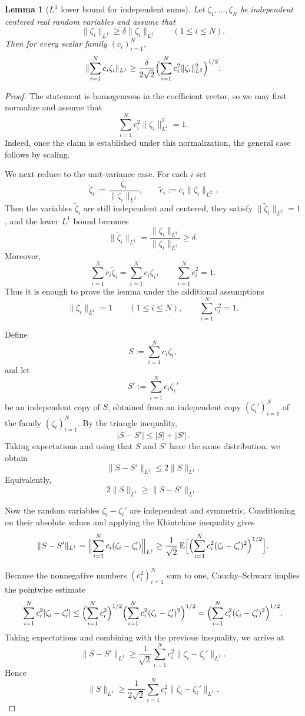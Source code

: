 \documentclass[11pt]{amsart}
\numberwithin{equation}{section}
\newtheorem{lemma}[theorem]{Lemma}
\theoremstyle{definition}
\theoremstyle{remark}
\newcommand{\E}{\mathbb E}
\newcommand{\abs}[1]{\lvert #1 \rvert}
\newcommand{\norm}[1]{\lVert #1 \rVert}
\begin{document}
\begin{lemma}[$L^1$ lower bound for independent sums]\label{lem:l1lower}
Let $\zeta_1,\dots,\zeta_N$ be independent centered real random variables and
assume that
\[
\norm{\zeta_i}_{L^1}\ge \delta \norm{\zeta_i}_{L^2}
\qquad(1\le i\le N).
\]
Then for every scalar family $(c_i)_{i=1}^N$,
\[
\norm{\sum_{i=1}^N c_i\zeta_i}_{L^1}
\ge
\frac{\delta}{2\sqrt2}
\Bigl(\sum_{i=1}^N c_i^2\norm{\zeta_i}_{L^2}^2\Bigr)^{1/2}.
\]
\end{lemma}

\begin{proof}
The statement is homogeneous in the coefficient vector, so we may first
normalize and assume that
\[
\sum_{i=1}^N c_i^2\norm{\zeta_i}_{L^2}^2=1.
\]
Indeed, once the claim is established under this normalization, the general
case follows by scaling.

We next reduce to the unit-variance case.  For each $i$ set
\[
\widetilde\zeta_i:=\frac{\zeta_i}{\norm{\zeta_i}_{L^2}},
\qquad
\widetilde c_i:=c_i\norm{\zeta_i}_{L^2}.
\]
Then the variables $\widetilde\zeta_i$ are still independent and centered,
they satisfy $\norm{\widetilde\zeta_i}_{L^2}=1$, and the lower $L^1$ bound
becomes
\[
\norm{\widetilde\zeta_i}_{L^1}
=\frac{\norm{\zeta_i}_{L^1}}{\norm{\zeta_i}_{L^2}}
\ge \delta.
\]
Moreover,
\[
\sum_{i=1}^N \widetilde c_i \widetilde\zeta_i
=\sum_{i=1}^N c_i\zeta_i,
\qquad
\sum_{i=1}^N \widetilde c_i^2
=1.
\]
Thus it is enough to prove the lemma under the additional assumptions
\[
\norm{\zeta_i}_{L^2}=1
\qquad(1\le i\le N),
\qquad
\sum_{i=1}^N c_i^2=1.
\]

Define
\[
S:=\sum_{i=1}^N c_i\zeta_i,
\]
and let
\[
S':=\sum_{i=1}^N c_i\zeta_i'
\]
be an independent copy of $S$, obtained from an independent copy
$(\zeta_i')_{i=1}^N$ of the family $(\zeta_i)_{i=1}^N$.
By the triangle inequality,
\[
\abs{S-S'}\le \abs{S}+\abs{S'}.
\]
Taking expectations and using that $S$ and $S'$ have the same distribution, we
obtain
\[
\norm{S-S'}_{L^1}\le 2\norm{S}_{L^1}.
\]
Equivalently,
\[
2\norm{S}_{L^1}\ge \norm{S-S'}_{L^1}.
\]

Now the random variables $\zeta_i-\zeta_i'$ are independent and symmetric.
Conditioning on their absolute values and applying the Khintchine inequality
gives
\[
\norm{S-S'}_{L^1}
=
\Bigl\|\sum_{i=1}^N c_i(\zeta_i-\zeta_i')\Bigr\|_{L^1}
\ge
\frac{1}{\sqrt2}\,
\E\Bigl[\Bigl(\sum_{i=1}^N c_i^2(\zeta_i-\zeta_i')^2\Bigr)^{1/2}\Bigr].
\]

Because the nonnegative numbers $(c_i^2)_{i=1}^N$ sum to one, Cauchy--Schwarz
implies the pointwise estimate
\[
\sum_{i=1}^N c_i^2\abs{\zeta_i-\zeta_i'}
\le
\Bigl(\sum_{i=1}^N c_i^2\Bigr)^{1/2}
\Bigl(\sum_{i=1}^N c_i^2(\zeta_i-\zeta_i')^2\Bigr)^{1/2}
=
\Bigl(\sum_{i=1}^N c_i^2(\zeta_i-\zeta_i')^2\Bigr)^{1/2}.
\]
Taking expectations and combining with the previous inequality, we arrive at
\[
\norm{S-S'}_{L^1}
\ge
\frac{1}{\sqrt2}\sum_{i=1}^N c_i^2\norm{\zeta_i-\zeta_i'}_{L^1}.
\]
Hence
\[
\norm{S}_{L^1}
\ge
\frac{1}{2\sqrt2}\sum_{i=1}^N c_i^2\norm{\zeta_i-\zeta_i'}_{L^1}.
\]


\end{proof}
\end{document}
